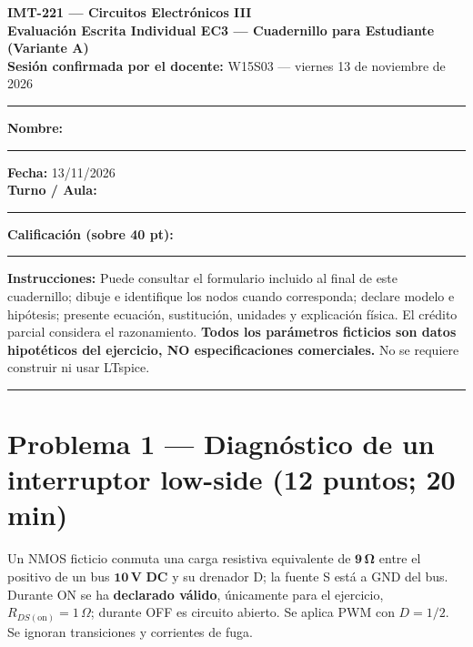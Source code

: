 \documentclass[11pt, a4paper]{article}
\begin{document}
\noindent
{\LARGE \textbf{\textcolor{ucbblue}{IMT-221 — Circuitos Electrónicos III}}}\\[0.12cm]
{\Large \textbf{Evaluación Escrita Individual EC3 — Cuadernillo para Estudiante (Variante A)}}\\[0.08cm]
{\small \textbf{Sesión confirmada por el docente:} W15S03 — viernes 13 de noviembre de 2026}
\par\vspace{0.15cm}\noindent\rule{\linewidth}{0.6pt}\vspace{0.15cm}

\noindent
\textbf{Nombre:} \rule{6.2cm}{0.4pt} \textbf{Fecha:} 13/11/2026\\[0.2cm]
 \quad \textbf{Turno / Aula:} \rule{4.2cm}{0.4pt} \quad \textbf{Calificación (sobre 40 pt):} \rule{2.4cm}{0.4pt}

\vspace{0.15cm}
\noindent
{}

\vspace{0.15cm}
\noindent
\textbf{Instrucciones:} Puede consultar el formulario incluido al final de este cuadernillo; dibuje e identifique los nodos cuando corresponda; declare modelo e hipótesis; presente ecuación, sustitución, unidades y explicación física. El crédito parcial considera el razonamiento. \textbf{Todos los parámetros ficticios son datos hipotéticos del ejercicio, NO especificaciones comerciales.} No se requiere construir ni usar LTspice.

\par\vspace{0.15cm}\noindent\rule{\linewidth}{0.4pt}

\section*{Problema 1 — Diagnóstico de un interruptor low-side (12 puntos; 20 min)}

Un NMOS ficticio conmuta una carga resistiva equivalente de $\mathbf{9\,\Omega}$ entre el positivo de un bus $\mathbf{10\,\text{V}}$ \textbf{DC} y su drenador D; la fuente S está a GND del bus. Durante ON se ha \textbf{declarado válido}, únicamente para el ejercicio, $R_{DS(\text{on})} = 1\,\Omega$; durante OFF es circuito abierto. Se aplica PWM con $D = 1/2$. Se ignoran transiciones y corrientes de fuga.
\end{document}
